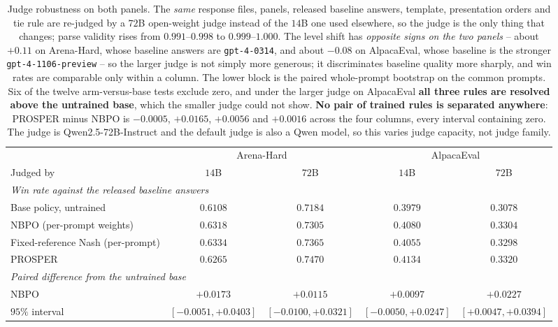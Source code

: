\documentclass{article}
\theoremstyle{remark}
\theoremstyle{plain}
\begin{document}
\begin{table}[H]
\centering\small
\caption{Judge robustness on both panels. The \emph{same} response files,
panels, released baseline answers, template, presentation orders and tie rule
are re-judged by a $72$B open-weight judge instead of the $14$B one used
elsewhere, so the judge is the only thing that changes; parse validity rises
from $0.991$--$0.998$ to $0.999$--$1.000$. The level shift has \emph{opposite
signs on the two panels} -- about $+0.11$ on Arena-Hard, whose baseline answers
are \texttt{gpt-4-0314}, and about $-0.08$ on AlpacaEval, whose baseline is the
stronger \texttt{gpt-4-1106-preview} -- so the larger judge is not simply more
generous; it discriminates baseline quality more sharply, and win rates are
comparable only within a column. The lower block is the paired whole-prompt
bootstrap on the common prompts. Six of the twelve arm-versus-base tests
exclude zero, and under the larger judge on AlpacaEval \textbf{all three rules
are resolved above the untrained base}, which the smaller judge could not show.
\textbf{No pair of trained rules is separated anywhere}: PROSPER minus NBPO is
$-0.0005$, $+0.0165$, $+0.0056$ and $+0.0016$ across the four columns, every
interval containing zero. The judge is Qwen2.5-72B-Instruct and the default
judge is also a Qwen model, so this varies judge capacity, not judge family.}
\label{tab:prosper-setting-judge}
\begin{tabular}{lcccc}
\toprule
& \multicolumn{2}{c}{Arena-Hard} & \multicolumn{2}{c}{AlpacaEval}\\
\cmidrule(lr){2-3}\cmidrule(lr){4-5}
Judged by & $14$B & $72$B & $14$B & $72$B\\
\midrule
\multicolumn{5}{l}{\emph{Win rate against the released baseline answers}}\\
Base policy, untrained & $0.6108$ & $0.7184$ & $0.3979$ & $0.3078$\\
NBPO (per-prompt weights) & $0.6318$ & $0.7305$ & $0.4080$ & $0.3304$\\
Fixed-reference Nash (per-prompt) & $\mathbf{0.6334}$ & $0.7365$ & $0.4055$ & $0.3298$\\
PROSPER \citep{zhang2026prosper} & $0.6265$ & $\mathbf{0.7470}$ & $\mathbf{0.4134}$ & $\mathbf{0.3320}$\\
\midrule
\multicolumn{5}{l}{\emph{Paired difference from the untrained base}}\\
NBPO & $+0.0173$ & $+0.0115$ & $+0.0097$ & $\mathbf{+0.0227}$\\
\quad $95\%$ interval & \tiny{$[-0.0051,+0.0403]$} & \tiny{$[-0.0100,+0.0321]$} & \tiny{$[-0.0050,+0.0247]$} & \tiny{$[+0.0047,+0.0394]$}\\

\end{tabular}
\end{table}
\end{document}
